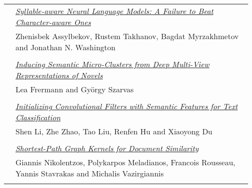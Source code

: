 \begin{tabular}{p{20mm}p{128mm}}
 & \hyperlink{page.1866}{\em Syllable-aware Neural Language Models: A Failure to Beat Character-aware Ones}\\
         & Zhenisbek Assylbekov, Rustem Takhanov, Bagdat Myrzakhmetov and Jonathan N. Washington \\
\\

 & \hyperlink{page.1873}{\em Inducing Semantic Micro-Clusters from Deep Multi-View Representations of Novels}\\
         & Lea Frermann and Gy\"{o}rgy Szarvas \\
\\

 & \hyperlink{page.1884}{\em Initializing Convolutional Filters with Semantic Features for Text Classification}\\
         & Shen Li, Zhe Zhao, Tao Liu, Renfen Hu and Xiaoyong Du \\
\\

 & \hyperlink{page.1890}{\em Shortest-Path Graph Kernels for Document Similarity}\\
         & Giannis Nikolentzos, Polykarpos Meladianos, Francois Rousseau, Yannis Stavrakas and Michalis Vazirgiannis \\
\\

\end{tabular}
\newpage
